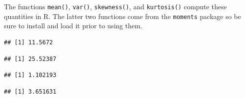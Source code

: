 \documentclass[
]{book}
\newenvironment{Shaded}{\begin{snugshade}}{\end{snugshade}}
\newcommand{\DocumentationTok}[1]{\textcolor[rgb]{0.56,0.35,0.01}{\textbf{\textit{#1}}}}
\newcommand{\FunctionTok}[1]{\textcolor[rgb]{0.13,0.29,0.53}{\textbf{#1}}}
\newcommand{\NormalTok}[1]{#1}
\newcommand{\SpecialCharTok}[1]{\textcolor[rgb]{0.81,0.36,0.00}{\textbf{#1}}}
\begin{document}
The functions \texttt{mean()}, \texttt{var()}, \texttt{skewness()}, and \texttt{kurtosis()} compute these quantities in R. The latter two functions come from the \texttt{moments} package so be sure to install and load it prior to using them.

\begin{Shaded}
\end{Shaded}

\begin{verbatim}
## [1] 11.5672
\end{verbatim}

\begin{Shaded}
\end{Shaded}

\begin{verbatim}
## [1] 25.52387
\end{verbatim}

\begin{Shaded}
\end{Shaded}

\begin{verbatim}
## [1] 1.102193
\end{verbatim}

\begin{Shaded}
\end{Shaded}

\begin{verbatim}
## [1] 3.651631
\end{verbatim}
\end{document}

